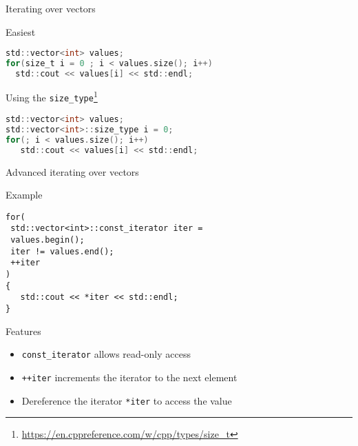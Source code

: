\documentclass[\classoption]{beamer}
\begin{document}
\begin{frame}[fragile]{Iterating over vectors}

\begin{block}{Easiest}
\begin{lstlisting}[language=C]
std::vector<int> values;
for(size_t i = 0 ; i < values.size(); i++)
  std::cout << values[i] << std::endl;
\end{lstlisting}
\end{block}

\begin{block}{Using the \lstinline|size_type|\footnote{\tiny\url{https://en.cppreference.com/w/cpp/types/size_t}}}
\begin{lstlisting}[language=C]
std::vector<int> values;
std::vector<int>::size_type i = 0;
for(; i < values.size(); i++)
   std::cout << values[i] << std::endl;
\end{lstlisting}
\end{block}

\end{frame}


\begin{frame}[fragile]{Advanced iterating over vectors}

\begin{block}{Example}
\begin{lstlisting}
for(
 std::vector<int>::const_iterator iter =
 values.begin();
 iter != values.end(); 
 ++iter
)
{
   std::cout << *iter << std::endl;
}
\end{lstlisting}
\end{block}
\begin{block}{Features}
\begin{itemize}
\item \lstinline|const_iterator| allows read-only access
\item \lstinline|++iter| increments the iterator to the next element
\item Dereference the iterator \lstinline|*iter| to access the value
\end{itemize}
\end{block}


\end{frame}
\end{document}
